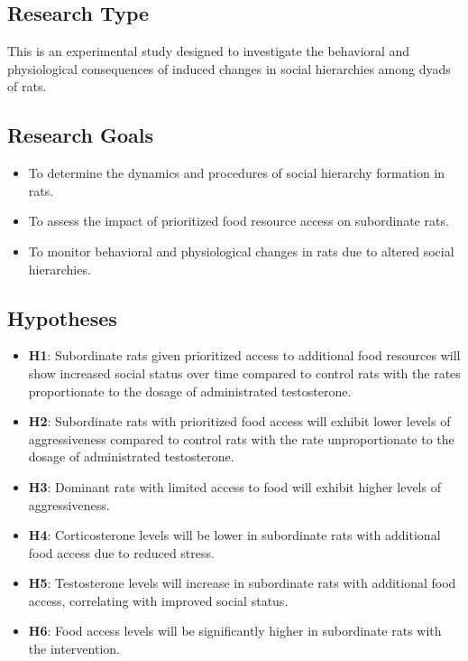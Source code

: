 \documentclass[english, a4paper, 11pt]{article}
\begin{document}
\subsection*{Research Type}

This is an experimental study designed to investigate the behavioral and physiological consequences of induced changes in social hierarchies among dyads of rats.

\subsection*{Research Goals}

\begin{itemize}
    \item To determine the dynamics and procedures of social hierarchy formation in rats.
    \item To assess the impact of prioritized food resource access on subordinate rats.
    \item To monitor behavioral and physiological changes in rats due to altered social hierarchies.
\end{itemize}
\subsection*{Hypotheses}

\begin{itemize}
    \item \textbf{H1}: Subordinate rats given prioritized access to additional food resources will show increased social status over time compared to control rats with the rates proportionate to the dosage of administrated testosterone.
    \item \textbf{H2}: Subordinate rats with prioritized food access will exhibit lower levels of aggressiveness compared to control rats with the rate unproportionate to the dosage of administrated testosterone.
    \item \textbf{H3}: Dominant rats with limited access to food will exhibit higher levels of aggressiveness.
    \item \textbf{H4}: Corticosterone levels will be lower in subordinate rats with additional food access due to reduced stress.
    \item \textbf{H5}: Testosterone levels will increase in subordinate rats with additional food access, correlating with improved social status.
    \item \textbf{H6}: Food access levels will be significantly higher in subordinate rats with the intervention.
\end{itemize}
\end{document}
